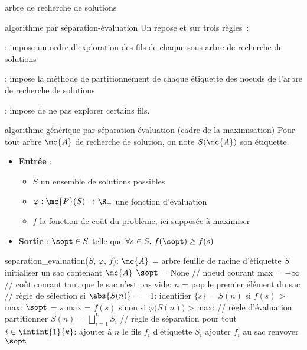 \begin{adjustwidth}{-3cm}{-3cm}
\begin{definition}{6.10}{arbre de recherche de solutions}
\end{definition}

\begin{definition}{6.11}{algorithme par séparation-évaluation}
    Un  repose  et sur trois règles~:
    \begin{enumeratebf}
        \item {} : impose un ordre d'exploration des fils de chaque sous-arbre de recherche de solutions
        \item {} : impose la méthode de partitionnement de chaque étiquette des noeuds de l'arbre de recherche de solutions
        \item {} : impose de ne pas explorer certains fils.
    \end{enumeratebf}
\end{definition}

\begin{implementation}{algorithme générique par séparation-évaluation (cadre de la maximisation)}
    Pour tout arbre $\mc{A}$ de recherche de solution, on note $S(\mc{A})$ son étiquette.
    \begin{itemize}
        \item \textbf{Entrée} :
        \begin{itemize}
            \item $S$ un ensemble de solutions possibles
            \item $\varphi : \mc{P}(S) \to \R_+$ une fonction d'évaluation
            \item $f$ la fonction de coût du problème, ici supposée à maximiser
        \end{itemize}
        \item \textbf{Sortie} : $\sopt \in S$ telle que $\forall s \in S,\, f(\sopt) \geq f(s)$
    \end{itemize}
    \begin{lstLNat}
    separation_evaluation($S$, $\varphi$, $f$):
        $\mc{A}$ = arbre feuille de racine d'étiquette $S$
        initialiser un sac contenant $\mc{A}$
        $\sopt$ = None // noeud courant
        max = $-\infty$ // coût courant
        tant que le sac n'est pas vide:
            $n$ = pop le premier élément du sac // règle de sélection
            si $\abs{S(n)}$ == 1:
                identifier $\{s\}$ = $S(n)$
                si $f(s)$ > max:
                    $\sopt$ = $s$
                    max = $f(s)$
            sinon si $\varphi\big(S(n)\big)$ > max: // règle d'évaluation
                partitionner $S(n)$ = $\bigsqcup_{i=1}^{k}S_i$ // règle de séparation
                pour tout $i \in \intint{1}{k}$:
                    ajouter à $n$ le fils $f_i$ d'étiquette $S_i$
                    ajouter $f_i$ au sac
        renvoyer $\sopt$


\end{lstLNat}
\end{implementation}
\end{adjustwidth}
